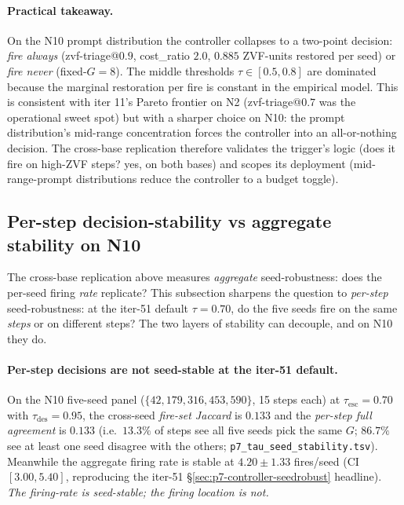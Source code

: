 \paragraph{Practical takeaway.}
On the N10 prompt distribution the controller collapses to a
two-point decision: \emph{fire always} (zvf-triage@$0.9$,
cost\_ratio $2.0$, $0.885$ ZVF-units restored per seed) or
\emph{fire never} (fixed-$G{=}8$). The middle thresholds
$\tau \in [0.5, 0.8]$ are dominated because the marginal
restoration per fire is constant in the empirical model. This
is consistent with iter 11's Pareto frontier on N2 (zvf-triage@$0.7$
was the operational sweet spot) but with a sharper choice on N10:
the prompt distribution's mid-range concentration forces the
controller into an all-or-nothing decision. The cross-base
replication therefore validates the trigger's logic (does it
fire on high-ZVF steps? yes, on both bases) and scopes its
deployment (mid-range-prompt distributions reduce the controller
to a budget toggle).

\subsection{Per-step decision-stability vs aggregate stability on N10}
\label{sec:p7-tau-decision-stability}

The cross-base replication above measures
\emph{aggregate} seed-robustness: does the per-seed firing
\emph{rate} replicate?  This subsection sharpens the
question to \emph{per-step} seed-robustness: at the iter-51
default $\tau{=}0.70$, do the five seeds fire on the same
\emph{steps} or on different steps?  The two layers of
stability can decouple, and on N10 they do.

\paragraph{Per-step decisions are not seed-stable at the
iter-51 default.}
On the N10 five-seed panel ($\{42, 179, 316, 453, 590\}$, 15
steps each) at $\tau_{\mathrm{esc}}{=}0.70$ with
$\tau_{\mathrm{des}}{=}0.95$, the cross-seed
\emph{fire-set Jaccard} is $0.133$ and the \emph{per-step
full agreement} is $0.133$ (i.e.\ $13.3\%$ of steps see all
five seeds pick the same $G$; $86.7\%$ see at least one
seed disagree with the others;
\texttt{p7\_tau\_seed\_stability.tsv}).
Meanwhile the aggregate firing rate is stable at
$4.20 \pm 1.33$ fires/seed (CI $[3.00, 5.40]$, reproducing
the iter-51 \S\ref{sec:p7-controller-seedrobust} headline).
\emph{The firing-rate is seed-stable; the firing
\emph{location} is not.}

